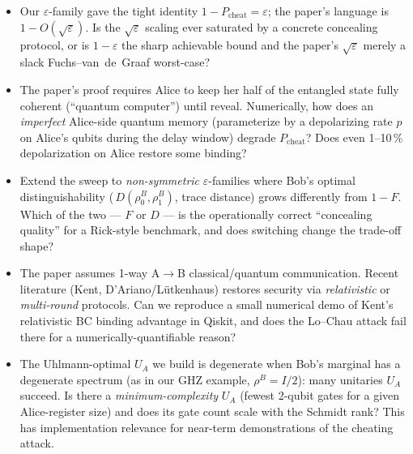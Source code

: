 \documentclass[11pt]{article}
\begin{document}
\begin{itemize}[leftmargin=*]
\item[\textbf{Q1.}] Our $\varepsilon$-family gave the tight identity
      $1-P_\mathrm{cheat}=\varepsilon$; the paper's language is
      $1-O(\sqrt\varepsilon)$.  Is the $\sqrt\varepsilon$ scaling ever
      saturated by a concrete concealing protocol, or is
      $1-\varepsilon$ the sharp achievable bound and the paper's
      $\sqrt\varepsilon$ merely a slack Fuchs--van~de~Graaf worst-case?
\item[\textbf{Q2.}] The paper's proof requires Alice to keep her half of
      the entangled state fully coherent (``quantum computer'') until
      reveal.  Numerically, how does an \emph{imperfect} Alice-side
      quantum memory (parameterize by a depolarizing rate $p$ on Alice's
      qubits during the delay window) degrade $P_\mathrm{cheat}$?  Does
      even 1--10\,\% depolarization on Alice restore some binding?
\item[\textbf{Q3.}] Extend the sweep to \emph{non-symmetric}
      $\varepsilon$-families where Bob's optimal distinguishability
      (\,$D(\rho^B_0,\rho^B_1)$, trace distance) grows differently from
      $1-F$.  Which of the two --- $F$ or $D$ --- is the operationally
      correct ``concealing quality'' for a Rick-style benchmark, and does
      switching change the trade-off shape?
\item[\textbf{Q4.}] The paper assumes 1-way A$\to$B classical/quantum
      communication.  Recent literature (Kent, D'Ariano/L\"utkenhaus)
      restores security via \emph{relativistic} or \emph{multi-round}
      protocols.  Can we reproduce a small numerical demo of Kent's
      relativistic BC binding advantage in Qiskit, and does the
      Lo--Chau attack fail there for a numerically-quantifiable reason?
\item[\textbf{Q5.}] The Uhlmann-optimal $U_A$ we build is degenerate when
      Bob's marginal has a degenerate spectrum (as in our GHZ example,
      $\rho^B=I/2$): many unitaries $U_A$ succeed.  Is there a
      \emph{minimum-complexity} $U_A$ (fewest 2-qubit gates for a given
      Alice-register size) and does its gate count scale with the
      Schmidt rank?  This has implementation relevance for near-term
      demonstrations of the cheating attack.
\end{itemize}
\end{document}
